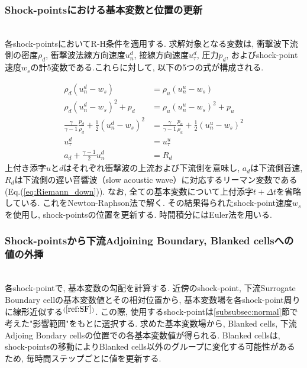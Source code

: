 \documentclass[a4j]{jarticle}
\begin{document}
\subsubsection{Shock-pointsにおける基本変数と位置の更新} \label{subsubsec:rankine}
\mbox{}\\[-3.0ex] 

各shock-pointsにおいてR-H条件を適用する.
求解対象となる変数は, 衝撃波下流側の密度$\rho_d$, 衝撃波法線方向速度$u_n^d$, 接線方向速度$u_\tau^d$, 
圧力$p_d$, およびshock-point速度$w_s$の計5変数である.これらに対して, 以下の5つの式が構成される.

\begin{equation}\label{eq:R-H}
\begin{aligned}
 \rho_d (u_n^d - w_s) &= \rho_u (u_n^u - w_s) \\
 \rho_d (u_n^d - w_s)^2 + p_d &= \rho_u (u_n^u - w_s)^2 + p_u \\
 \frac{\gamma}{\gamma - 1} \frac{p_d}{\rho_d} + \frac{1}{2}(u_n^d - w_s)^2 &= \frac{\gamma}{\gamma - 1} \frac{p_u}{\rho_u} + \frac{1}{2}(u_n^u - w_s)^2\\
 u_\tau^d &= u_\tau^u\\
 a_d + \frac{\gamma - 1}{2} u_n^d &= R_d 
\end{aligned}
\end{equation}
上付き添字$u$と$d$はそれぞれ衝撃波の上流および下流側を意味し, $a_d$は下流側音速, 
$R_d$は下流側の遅い音響波（slow acoustic wave）に対応するリーマン変数である(Eq.(\ref{eq:Riemann_down})). なお, 全ての基本変数について上付添字$t+\Delta t$を省略している.
これをNewton-Raphson法で解く.
その結果得られたshock-point速度$w_s$を使用し, shock-pointsの位置を更新する.
時間積分にはEuler法を用いる.
\subsubsection{Shock-pointsから下流Adjoining Boundary, Blanked cellsへの値の外挿} \label{subsubsec:adjoining}
\mbox{}\\[-3.0ex] 

各shock-pointで, 基本変数の勾配を計算する.
近傍のshock-point, 下流Surrogate Boundary cellの基本変数値とその相対位置から, 
基本変数場を各shock-point周りに線形近似する$^{(\ref{ref:SF})}$.
この際, 使用するshock-pointは\ref{subsubsec:normal}節で考えた"影響範囲"をもとに選択する.
求めた基本変数場から, Blanked cells, 下流Adjoing Bondary cellsの位置での各基本変数値が得られる.
Blanked cellsは, shock-pointsの移動によりBlanked cells以外のグループに変化する可能性があるため,
毎時間ステップごとに値を更新する.
\end{document}
